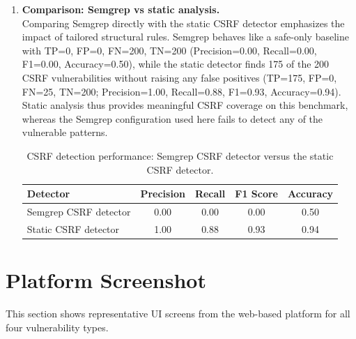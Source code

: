 \begin{enumerate}
  \item \textbf{Comparison: Semgrep vs static analysis.}\\
  Comparing Semgrep directly with the static CSRF detector emphasizes the impact of
  tailored structural rules. Semgrep behaves like a safe-only baseline with TP=0, FP=0,
  FN=200, TN=200 (Precision=0.00, Recall=0.00, F1=0.00, Accuracy=0.50), while the static
  detector finds 175 of the 200 CSRF vulnerabilities without raising any false positives
  (TP=175, FP=0, FN=25, TN=200; Precision=1.00, Recall=0.88, F1=0.93, Accuracy=0.94).
  Static analysis thus provides meaningful CSRF coverage on this benchmark, whereas the
  Semgrep configuration used here fails to detect any of the vulnerable patterns.

  \begin{table}[htbp]
    \centering
    \small
    \begin{tabular}{lcccc}
      \textbf{Detector} & \textbf{Precision} & \textbf{Recall} & \textbf{F1 Score} & \textbf{Accuracy} \\
      \hline
      Semgrep CSRF detector & 0.00 & 0.00 & 0.00 & 0.50 \\
      Static CSRF detector & 1.00 & 0.88 & 0.93 & 0.94 \\
    \end{tabular}
    \caption{CSRF detection performance: Semgrep CSRF detector versus the static CSRF detector.}
    \label{tab:csrf_semgrep_vs_static}
  \end{table}
\end{enumerate}

\section{Platform Screenshot}
\label{sec:platform_screenshots}

This section shows representative UI screens from the web-based platform for all
four vulnerability types.

